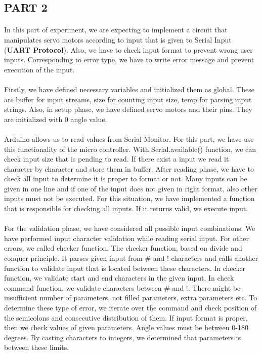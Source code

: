 \documentclass[pdftex,12pt,a4paper]{article}
\begin{document}
\begin{flushleft}
\subsection{PART 2}
\paragraph{}
In this part of experiment, we are expecting to implement a circuit that manipulates servo motors according to input that is given to Serial Input (\textbf{UART Protocol}). Also, we have to check input format to prevent wrong user inputs. Corresponding to error type, we have to write error message and prevent execution of the input.
\paragraph{}
Firstly, we have defined necessary variables and initialized them as global. These are buffer for input streams, size for counting input size, temp for parsing input strings. Also, in setup phase, we have defined servo motors and their pins. They are initialized with 0 angle value.
\paragraph{}
Arduino allows us to read values from Serial Monitor. For this part, we have use this functionality of the micro controller. With Serial.available() function, we can check input size that is pending to read. If there exist a input we read it character by character and store them in buffer. After reading phase, we have to check all input to determine it is proper to format or not. Many inputs can be given in one line and if one of the input does not given in right format, also other inputs must not be executed. For this situation, we have implemented a function that is responsible for checking all inputs. If it returns valid, we execute input.
\paragraph{}
For the validation phase, we have considered all possible input combinations. We have performed input character validation while reading serial input. For other errors, we called checker function. The checker function, based on divide and conquer principle. It parses given input from \# and ! characters and calls another function to validate input that is located between these characters. In checker function, we validate start and end characters in the given input. In check command function, we validate characters between \# and !. There might be insufficient number of parameters, not filled parameters, extra parameters etc. To determine these type of error, we iterate over the command and check position of the semicolons and consecutive distribution of them. If input format is proper, then we check values of given parameters. Angle values must be between 0-180 degrees. By casting characters to integers, we determined that parameters is between these limits.

\end{flushleft}
\end{document}
